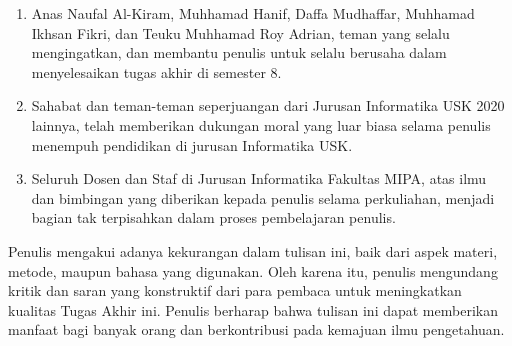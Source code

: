 \begin{enumerate}
	\item Anas Naufal Al-Kiram, Muhhamad Hanif, Daffa Mudhaffar, Muhhamad Ikhsan Fikri, dan Teuku Muhhamad Roy Adrian, teman yang selalu mengingatkan, dan membantu penulis untuk selalu berusaha dalam menyelesaikan tugas akhir di semester 8.
    \item Sahabat dan teman-teman seperjuangan dari Jurusan Informatika USK 2020 lainnya, telah memberikan dukungan moral yang luar biasa selama penulis menempuh pendidikan di jurusan Informatika USK.
    \item Seluruh Dosen dan Staf di Jurusan Informatika Fakultas MIPA, atas ilmu dan bimbingan yang diberikan kepada penulis selama perkuliahan, menjadi bagian tak terpisahkan dalam proses pembelajaran penulis.
\end{enumerate}


Penulis mengakui adanya kekurangan dalam tulisan ini, baik dari aspek materi, metode, maupun bahasa yang digunakan. Oleh karena itu, penulis mengundang kritik dan saran yang konstruktif dari para pembaca untuk meningkatkan kualitas Tugas Akhir ini. Penulis berharap bahwa tulisan ini dapat memberikan manfaat bagi banyak orang dan berkontribusi pada kemajuan ilmu pengetahuan.

\vspace{1cm}


	


